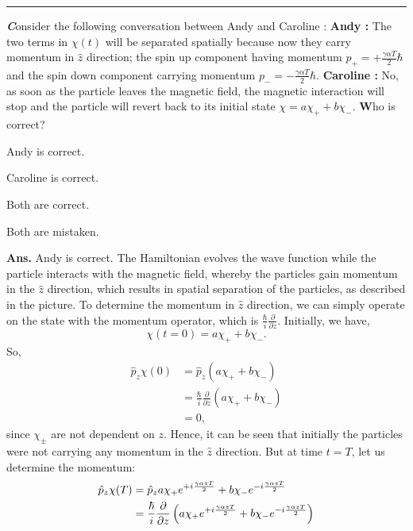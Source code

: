 \documentclass[12pt]{article}
\newcommand\tbf[1]{\textbf{#1}}
\newcommand\tans{\tbf{Ans. }}
\newcommand\del{\partial}
\newcommand\ddel[1]{\frac{\del}{\del {#1}}}
\newcommand\h[1]{\hat{#1}}
\newcommand\vs[1]{\vspace{#1}}
\newcommand\andy{Andy }
\newcommand\carol{Caroline }
\begin{document}
\begin{enumerate}[\bf 1.]
\hrule
\vspace{1cm}
{\it{\bf C}}onsider the following conversation between \andy and \carol: \vspace{0.5cm} \newline
{\bf \andy:} The two terms in $\chi(t)$ will be separated spatially because now they carry momentum in $\h{z}$ direction; the spin up component having momentum $p_+=+\frac{\gamma\alpha T}{2}\hbar$ and the spin down component carrying momentum $p_-=-\frac{\gamma\alpha T}{2}\hbar$.\newline
{\bf \carol:} No, as soon as the particle leaves the magnetic field, the magnetic interaction will stop and the particle will revert back to its initial state $\chi = a \chi_+ + b \chi_-$. \vspace{1cm} \newline
{\bf W}ho is correct?
\begin{enumerate}[\bf I.]
{
	\item \andy is correct.
	\item \carol is correct.
	\item Both are correct.
	\item Both are mistaken.
}\end{enumerate}
\vs{0.5cm}
\tans \andy is correct. The Hamiltonian evolves the wave function while the particle interacts with the magnetic field, whereby the particles gain momentum in the $\h{z}$ direction, which results in spatial separation of the particles, as described in the picture.
\newpage
\phantom{hell}
\vskip 5cm
To determine the momentum in $\h{z}$ direction, we can simply operate on the state with the momentum operator, which is $\frac{\hbar}{i}\ddel{z}$. \newline
Initially, we have,
$$\chi(t=0) = a\chi_++b\chi_-.$$
So,
$$
\begin{aligned}
	\h{p}_z \chi(0) &= \h{p}_z \left(a\chi_++ b \chi_-\right) \\
					&= \frac{\hbar}{i}\ddel{z} \left(a\chi_++ b \chi_-\right) \\
					&= 0,
\end{aligned}
$$
since $\chi_\pm$ are not dependent on $z$. Hence, it can be seen that initially the particles were not carrying any momentum in the $\h{z}$ direction. But at time $t=T$, let us determine the momentum:
$$
\begin{aligned}
	\h{p}_z \chi(T) &= \h{p}_z a \chi_+ e ^ {+i{{\gamma \alpha z T}\over{2}}} + b \chi_- e ^ {-i{{\gamma \alpha z T}\over{2}}} \\
					&= \frac{\hbar}{i}\ddel{z} \left(a \chi_+ e ^ {+i{{\gamma \alpha z T}\over{2}}} + b \chi_- e ^ {-i{{\gamma \alpha z T}\over{2}}} \right) \\

\end{aligned}$$
\end{enumerate}
\end{document}
